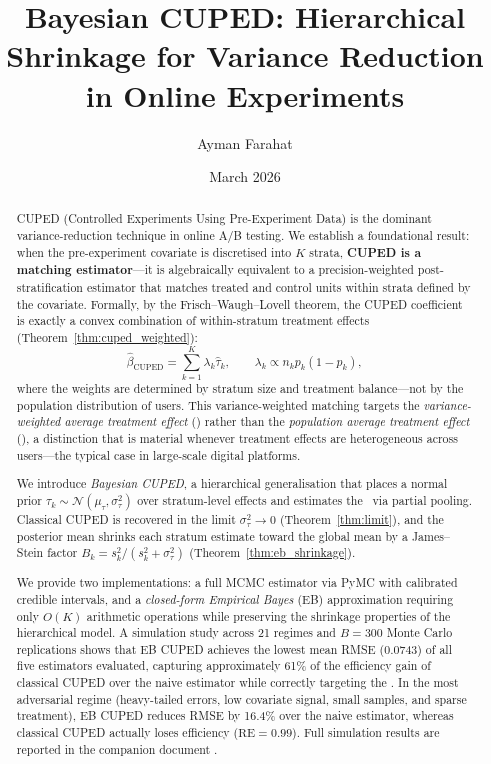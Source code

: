 \documentclass[12pt]{article}
\title{Bayesian CUPED: Hierarchical Shrinkage for Variance Reduction\\
       in Online Experiments}
\author{Ayman Farahat}
\date{March 2026}
\theoremstyle{plain}
\theoremstyle{definition}
\newcommand{\PATE}{\text{PATE}}
\newcommand{\VWATT}{\text{VWATT}}
\begin{document}
\maketitle

\begin{abstract}
CUPED (Controlled Experiments Using Pre-Experiment Data) is the dominant
variance-reduction technique in online A/B testing.
We establish a foundational result: when the pre-experiment covariate is
discretised into $K$ strata, \textbf{CUPED is a matching estimator}---it is
algebraically equivalent to a precision-weighted post-stratification
estimator that matches treated and control units within strata defined by
the covariate.
Formally, by the Frisch--Waugh--Lovell theorem, the CUPED coefficient is
exactly a convex combination of within-stratum treatment effects
(Theorem~\ref{thm:cuped_weighted}):
\[
  \hat{\beta}_{\text{CUPED}} = \sum_{k=1}^K \lambda_k \hat{\tau}_k,
  \qquad
  \lambda_k \propto n_k p_k(1-p_k),
\]
where the weights are determined by stratum size and treatment balance---not
by the population distribution of users.
This variance-weighted matching targets the \emph{variance-weighted average
treatment effect} (\VWATT) rather than the \emph{population average treatment
effect} (\PATE), a distinction that is material whenever treatment effects are
heterogeneous across users---the typical case in large-scale digital platforms.

We introduce \emph{Bayesian CUPED}, a hierarchical generalisation that places
a normal prior $\tau_k \sim \mathcal{N}(\mu_\tau, \sigma_\tau^2)$ over
stratum-level effects and estimates the \PATE\ via partial pooling.
Classical CUPED is recovered in the limit $\sigma_\tau^2 \to 0$
(Theorem~\ref{thm:limit}), and the posterior mean shrinks each stratum
estimate toward the global mean by a James--Stein factor
$B_k = s_k^2/(s_k^2 + \sigma_\tau^2)$ (Theorem~\ref{thm:eb_shrinkage}).

We provide two implementations: a full MCMC estimator via PyMC with
calibrated credible intervals, and a \emph{closed-form Empirical Bayes}
(EB) approximation requiring only $O(K)$ arithmetic operations while
preserving the shrinkage properties of the hierarchical model.
A simulation study across 21 regimes and $B = 300$ Monte Carlo replications
shows that EB CUPED achieves the lowest mean RMSE (0.0743) of all five
estimators evaluated, capturing approximately 61\% of the efficiency gain of
classical CUPED over the naive estimator while correctly targeting the \PATE.
In the most adversarial regime (heavy-tailed errors, low covariate signal,
small samples, and sparse treatment), EB CUPED reduces RMSE by 16.4\% over
the naive estimator, whereas classical CUPED actually loses efficiency
($\mathrm{RE} = 0.99$).
Full simulation results are reported in the companion document
\citep{farahat2026sim}.
\end{abstract}
\end{document}
